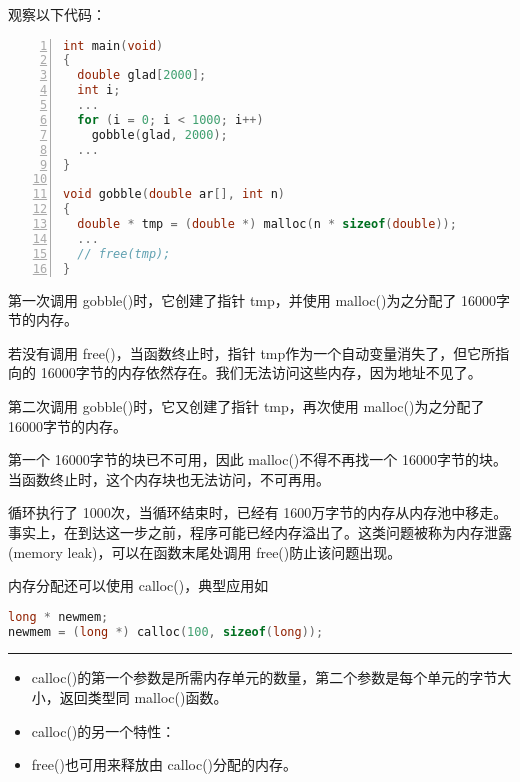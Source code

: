 \begin{frame}
  观察以下代码：
  \begin{lstlisting}[language=c,numbers=left,frame=single]
int main(void)
{
  double glad[2000];
  int i;
  ...
  for (i = 0; i < 1000; i++)
    gobble(glad, 2000);
  ...  
}

void gobble(double ar[], int n)
{
  double * tmp = (double *) malloc(n * sizeof(double));
  ...
  // free(tmp);
}
  \end{lstlisting}
\end{frame}

\begin{frame}[fragile]
  第一次调用{ gobble()}时，它创建了指针{ tmp}，并使用{ malloc()}为之分配了{ 16000}字节的内存。
  
  若没有调用{ free()}，当函数终止时，指针{ tmp}作为一个自动变量消失了，但它所指向的{ 16000}字节的内存依然存在。我们无法访问这些内存，因为地址不见了。
\end{frame}

\begin{frame}[fragile]
  第二次调用{ gobble()}时，它又创建了指针{ tmp}，再次使用{ malloc()}为之分配了{ 16000}字节的内存。

  第一个{ 16000}字节的块已不可用，因此{ malloc()}不得不再找一个{ 16000}字节的块。当函数终止时，这个内存块也无法访问，不可再用。
\end{frame}

\begin{frame}[fragile]
   循环执行了{ 1000}次，当循环结束时，已经有{ 1600}万字节的内存从内存池中移走。事实上，在到达这一步之前，程序可能已经内存溢出了。这类问题被称为内存泄露{ (memory leak)}，可以在函数末尾处调用{ free()}防止该问题出现。
\end{frame}

\begin{frame}[fragile]
  内存分配还可以使用{ calloc()}，典型应用如
  \begin{lstlisting}[language=c,backgroundcolor=\color{red!20}]
long * newmem;
newmem = (long *) calloc(100, sizeof(long));    
  \end{lstlisting}
  \rule{\textwidth}{0.3mm} \pause \vspace{0.3mm}
  
  \begin{itemize}
  \item   { calloc()}的第一个参数是所需内存单元的数量，第二个参数是每个单元的字节大小，返回类型同{ malloc()}函数。\\[0.1in]
  \item
    { calloc()}的另一个特性：\\[0.1in]
  \item
    { free()}也可用来释放由{ calloc()}分配的内存。
  \end{itemize}
\end{frame}

